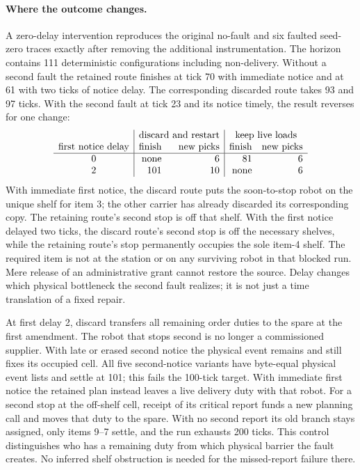 \documentclass[11pt]{article}
\begin{document}
\paragraph{Where the outcome changes.}
A zero-delay intervention reproduces the original no-fault and six faulted seed-zero traces exactly after removing the additional instrumentation. The horizon contains 111 deterministic configurations including non-delivery. Without a second fault the retained route finishes at tick 70 with immediate notice and at 61 with two ticks of notice delay. The corresponding discarded route takes 93 and 97 ticks. With the second fault at tick 23 and its notice timely, the result reverses for one change:
\[
\begin{array}{c|rr|rr}
 & \multicolumn{2}{c|}{\text{discard and restart}} &
 \multicolumn{2}{c}{\text{keep live loads}}\\
\text{first notice delay}&\text{finish}&\text{new picks}&\text{finish}&\text{new picks}\\\hline
0&\text{none}&6&81&6\\
2&101&10&\text{none}&6
\end{array}
\]
With immediate first notice, the discard route puts the soon-to-stop robot on the unique shelf for item 3; the other carrier has already discarded its corresponding copy. The retaining route's second stop is off that shelf. With the first notice delayed two ticks, the discard route's second stop is off the necessary shelves, while the retaining route's stop permanently occupies the sole item-4 shelf. The required item is not at the station or on any surviving robot in that blocked run. Mere release of an administrative grant cannot restore the source. Delay changes which physical bottleneck the second fault realizes; it is not just a time translation of a fixed repair.

At first delay 2, discard transfers all remaining order duties to the spare at the first amendment. The robot that stops second is no longer a commissioned supplier. With late or erased second notice the physical event remains and still fixes its occupied cell. All five second-notice variants have byte-equal physical event lists and settle at 101; this fails the 100-tick target. With immediate first notice the retained plan instead leaves a live delivery duty with that robot. For a second stop at the off-shelf cell, receipt of its critical report funds a new planning call and moves that duty to the spare. With no second report its old branch stays assigned, only items 9--7 settle, and the run exhausts 200 ticks. This control distinguishes who has a remaining duty from which physical barrier the fault creates. No inferred shelf obstruction is needed for the missed-report failure there.
\end{document}
